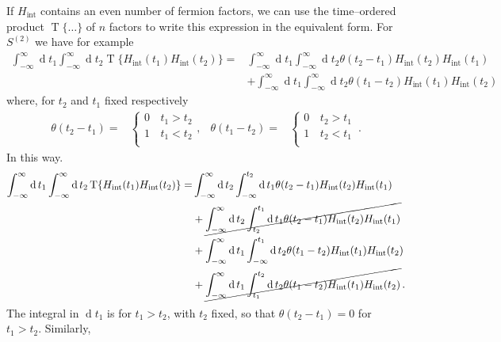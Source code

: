If $H_{\text{int}}$ contains an even number of fermion factors, we can use the time--ordered product $\operatorname{T}\{\ldots\}$ of $n$ factors to write this expression in the equivalent form. For $S^{(2)}$ we have for example
\begin{align}
 \int_{-\infty}^\infty \operatorname{d}t_1 \int_{-\infty}^{\infty}\operatorname{d}t_2 \operatorname{T}\{H_{\text{int}}(t_1)H_{\text{int}}(t_2)\}=&
\int_{-\infty}^\infty \operatorname{d}t_1\int_{-\infty}^{\infty}\operatorname{d}t_2 \theta(t_2-t_1)H_{\text{int}}(t_2)H_{\text{int}}(t_1) \nonumber\\
&+\int_{-\infty}^\infty \operatorname{d}t_1\int_{-\infty}^{\infty}\operatorname{d}t_2 \theta(t_1-t_2)H_{\text{int}}(t_1)H_{\text{int}}(t_2)
 \end{align}
where, for $t_2$ and $t_1$ fixed respectively
 \begin{align}
   \theta(t_2-t_1)=&
   \begin{cases}
    0\, &    t_1> t_2\\
    1\, &    t_1< t_2\\
   \end{cases},&   \theta(t_1-t_2)=&
   \begin{cases}
    0\, &    t_2> t_1\\
    1\, &    t_2< t_1\\
   \end{cases}\,.
 \end{align}
In this way.
\begin{align}
 \int_{-\infty}^\infty \operatorname{d}t_1 \int_{-\infty}^{\infty}\operatorname{d}t_2 \operatorname{T}\{H_{\text{int}}(t_1)H_{\text{int}}(t_2)\}=&
\int_{-\infty}^\infty \operatorname{d}t_2\int_{-\infty}^{t_2}\operatorname{d}t_1 \theta(t_2-t_1)H_{\text{int}}(t_2)H_{\text{int}}(t_1)\nonumber\\
&+\cancel{\int_{-\infty}^\infty \operatorname{d}t_2\int_{t_2}^{t_1}\operatorname{d}t_1 \theta(t_2-t_1)H_{\text{int}}(t_2)H_{\text{int}}(t_1)} \nonumber\\
&+\int_{-\infty}^\infty \operatorname{d}t_1\int_{-\infty}^{t_{1}}\operatorname{d}t_2 \theta(t_1-t_2)H_{\text{int}}(t_1)H_{\text{int}}(t_2) \nonumber\\
&+\cancel{\int_{-\infty}^\infty \operatorname{d}t_1\int_{t_1}^{t_2}\operatorname{d}t_2 \theta(t_1-t_2)H_{\text{int}}(t_1)H_{\text{int}}(t_2)}\,.
\end{align}
The integral in $\operatorname{d}t_1$ is for $t_1>t_2$, with $t_2$ fixed, so that $\theta(t_2-t_1)=0$ for $t_1>t_2$. Similarly,
